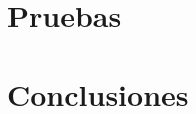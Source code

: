 \documentclass[12pt]{book}
\begin{document}
\chapter{Pruebas}

\chapter{Conclusiones}


\newpage


\clearpage

\appendix
\chapter{}


\chapter{}


\end{document}
